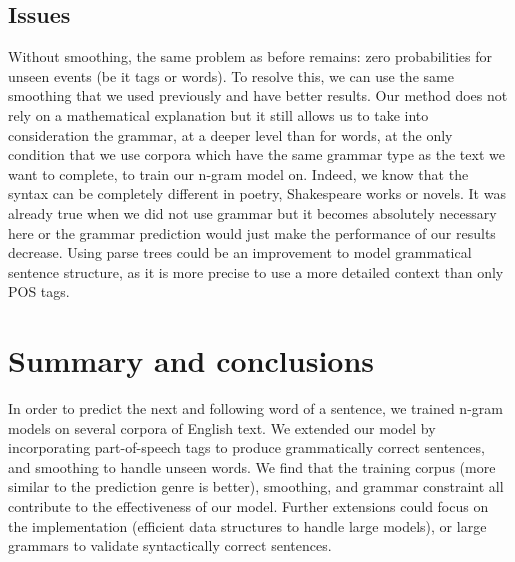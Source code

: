 \documentclass[a4paper,12pt]{article}
\begin{document}
\subsection{Issues}

Without smoothing, the same problem as before remains: zero probabilities for unseen events (be it tags or words). To resolve this, we can use the same smoothing that we used previously and have better results. Our method does not rely on a mathematical explanation but it still allows us to take into consideration the grammar, at a deeper level than for words, at the only condition that we use corpora which have the same grammar type as the text we want to complete, to train our n-gram model on. Indeed, we know that the syntax can be completely different in poetry, Shakespeare works or novels. It was already true when we did not use grammar but it becomes absolutely necessary here or the grammar prediction would just make the performance of our results decrease.
Using parse trees could be an improvement to model grammatical sentence structure, as it is more precise to use a more detailed context than only POS tags.

\section{Summary and conclusions}
\label{sec:summary}

In order to predict the next and following word of a sentence, we trained n-gram models on several corpora of English text.  We extended our model by incorporating part-of-speech tags to produce grammatically correct sentences, and smoothing to handle unseen words. 
We find that the training corpus (more similar to the prediction genre is better), smoothing, and grammar constraint all contribute to the effectiveness of our model.  Further extensions could focus on the implementation (efficient data structures to handle large models), or large grammars to validate syntactically correct sentences.

\nocite{*}


\end{document}
